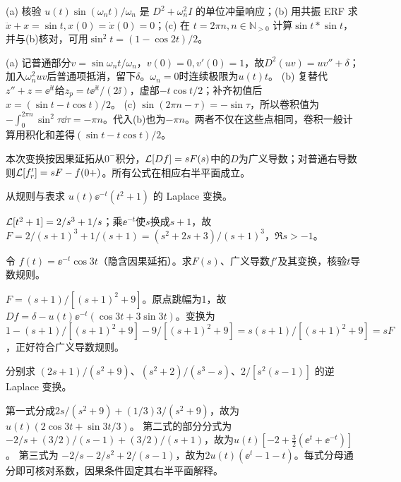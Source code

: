 \begin{exercise}\label{cw:rec17-4}
(a) 核验 $u(t)\sin(\omega_nt)/\omega_n$ 是 $D^2+\omega_n^2I$ 的单位冲量响应；(b) 用共振 ERF 求 $\ddot x+x=\sin t,x(0)=\dot x(0)=0$；(c) 在 $t=2\pi n,n\in\mathbb N_{>0}$ 计算$\sin t*\sin t$，并与(b)核对，可用$\sin^2t=(1-\cos2t)/2$。
\end{exercise}
\begin{solution}
(a) 记普通部分$v=\sin\omega_nt/\omega_n$，$v(0)=0,v'(0)=1$，故$D^2(uv)=u v''+\delta$；加入$\omega_n^2uv$后普通项抵消，留下$\delta$。$\omega_n=0$时连续极限为$u(t)t$。
(b) 复替代$z''+z=\ee^{\ii t}$给$z_p=t\ee^{\ii t}/(2\ii)$，虚部$-t\cos t/2$；补齐初值后 $x=(\sin t-t\cos t)/2$。
(c) $\sin(2\pi n-\tau)=-\sin\tau$，所以卷积值为$-\int_0^{2\pi n}\sin^2\tau\dd\tau=-\pi n$。代入(b)也为$-\pi n$。两者不仅在这些点相同，卷积一般计算用积化和差得$(\sin t-t\cos t)/2$。
\par{}
\end{solution}

本次变换按因果延拓从$0^-$积分，$\mathcal L[Df]=sF(s)$中的$D$为广义导数；对普通右导数则$\mathcal L[f_r']=sF-f(0+)$。所有公式在相应右半平面成立。
\begin{exercise}\label{cw:rec18-1}
从规则与表求 $u(t)\ee^{-t}(t^2+1)$ 的 Laplace 变换。
\end{exercise}
\begin{solution}
$\mathcal L[t^2+1]=2/s^3+1/s$；乘$\ee^{-t}$使$s$换成$s+1$，故 $F=2/(s+1)^3+1/(s+1)=(s^2+2s+3)/(s+1)^3$，$\Re s>-1$。
\par{}
\end{solution}

\begin{exercise}\label{cw:rec18-2}
令 $f(t)=\ee^{-t}\cos3t$（隐含因果延拓）。求$F(s)$、广义导数$f'$及其变换，核验$t$导数规则。
\end{exercise}
\begin{solution}
$F=(s+1)/[(s+1)^2+9]$。原点跳幅为1，故 $Df=\delta-u(t)\ee^{-t}(\cos3t+3\sin3t)$。变换为 $1-(s+1)/[(s+1)^2+9]-9/[(s+1)^2+9]=s(s+1)/[(s+1)^2+9]=sF$，正好符合广义导数规则。
\par{}
\end{solution}

\begin{exercise}\label{cw:rec18-3}
分别求 $(2s+1)/(s^2+9)$、$(s^2+2)/(s^3-s)$、$2/[s^2(s-1)]$ 的逆 Laplace 变换。
\end{exercise}
\begin{solution}
第一式分成$2s/(s^2+9)+(1/3)3/(s^2+9)$，故为$u(t)(2\cos3t+\sin3t/3)$。
第二式的部分分式为 $-2/s+(3/2)/(s-1)+(3/2)/(s+1)$，故为$u(t)[-2+\frac32(\ee^t+\ee^{-t})]$。
第三式为 $-2/s-2/s^2+2/(s-1)$，故为$2u(t)(\ee^t-1-t)$。每式分母通分即可核对系数，因果条件固定其右半平面解释。
\par{}
\end{solution}

